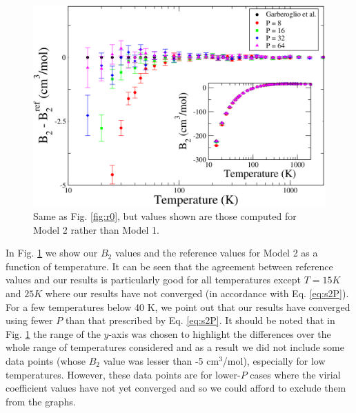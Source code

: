                 \begin{figure}[!htbp]
                    \centering
                    \includegraphics[scale=0.20,keepaspectratio]{Chapter-4/Figures/s2GarberoglioAll.png}
                    \caption{Same as Fig. \ref{fig:r0}, but values shown are those computed for Model 2 rather than Model 1.}
                    \label{fig:rT}
                \end{figure}
                In Fig. \ref{fig:rT} we show our $B_2$ values and the reference values for Model 2 as a function of temperature. It can be seen that the agreement between reference values and our results is particularly good for all temperatures except $T = 15 K$ and $25 K$ where our results have not converged (in accordance with Eq. \eqref{eq:s2P}). For a few temperatures below 40 K, we point out that our results have converged using fewer $P$ than that prescribed by Eq. \eqref{eq:s2P}. It should be noted that in Fig. \ref{fig:rT} the range of the $y$-axis was chosen to highlight the differences over the whole range of temperatures considered and as a result we did not include some data points (whose $B_2$ value was lesser than -5 cm$^3$/mol), especially for low temperatures. However, these data points are for lower-$P$ cases where the virial coefficient values have not yet converged and so we could afford to exclude them from the graphs.


